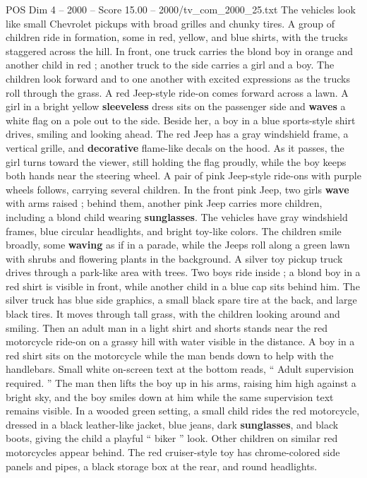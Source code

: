 \begin{textsample}{POS Dim 4 – 2000 – Score 15.00 – 2000/tv\_com\_2000\_25.txt}
The vehicles look like small Chevrolet pickups with broad grilles and chunky tires.
A group of children ride in formation, some in red, yellow, and blue shirts, with the trucks staggered across the hill.
In front, one truck carries the blond boy in orange and another child in red ; another truck to the side carries a girl and a boy.
The children look forward and to one another with excited expressions as the trucks roll through the grass.
A red Jeep-style ride-on comes forward across a lawn.
A girl in a bright yellow \textbf{sleeveless} dress sits on the passenger side and \textbf{waves} a white flag on a pole out to the side.
Beside her, a boy in a blue sports-style shirt drives, smiling and looking ahead.
The red Jeep has a gray windshield frame, a vertical grille, and \textbf{decorative} flame-like decals on the hood.
As it passes, the girl turns toward the viewer, still holding the flag proudly, while the boy keeps both hands near the steering wheel.
A pair of pink Jeep-style ride-ons with purple wheels follows, carrying several children.
In the front pink Jeep, two girls \textbf{wave} with arms raised ; behind them, another pink Jeep carries more children, including a blond child wearing \textbf{sunglasses}.
The vehicles have gray windshield frames, blue circular headlights, and bright toy-like colors.
The children smile broadly, some \textbf{waving} as if in a parade, while the Jeeps roll along a green lawn with shrubs and flowering plants in the background.
A silver toy pickup truck drives through a park-like area with trees.
Two boys ride inside ; a blond boy in a red shirt is visible in front, while another child in a blue cap sits behind him.
The silver truck has blue side graphics, a small black spare tire at the back, and large black tires.
It moves through tall grass, with the children looking around and smiling.
Then an adult man in a light shirt and shorts stands near the red motorcycle ride-on on a grassy hill with water visible in the distance.
A boy in a red shirt sits on the motorcycle while the man bends down to help with the handlebars.
Small white on-screen text at the bottom reads, “ Adult supervision required. ” The man then lifts the boy up in his arms, raising him high against a bright sky, and the boy smiles down at him while the same supervision text remains visible.
In a wooded green setting, a small child rides the red motorcycle, dressed in a black leather-like jacket, blue jeans, dark \textbf{sunglasses}, and black boots, giving the child a playful “ biker ” look.
Other children on similar red motorcycles appear behind.
The red cruiser-style toy has chrome-colored side panels and pipes, a black storage box at the rear, and round headlights.

\end{textsample}
